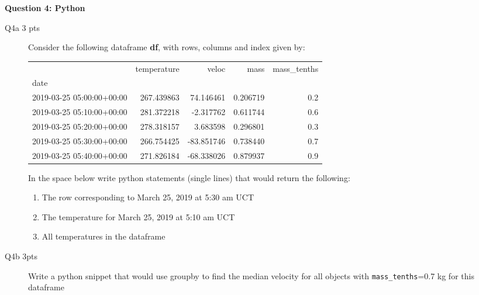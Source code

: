 \documentclass{article}
\begin{document}
\newpage
\textbf{Question 4: Python}
\begin{description}
\item[Q4a 3 pts] Consider the following dataframe \textbf{df}, with rows, columns and index given by:

\begin{tabular}{lrrrr}
\toprule
{} &  temperature &      veloc &      mass &  mass\_tenths \\
date                      &              &            &           &              \\
\midrule
2019-03-25 05:00:00+00:00 &   267.439863 &  74.146461 &  0.206719 &          0.2 \\
2019-03-25 05:10:00+00:00 &   281.372218 &  -2.317762 &  0.611744 &          0.6 \\
2019-03-25 05:20:00+00:00 &   278.318157 &   3.683598 &  0.296801 &          0.3 \\
2019-03-25 05:30:00+00:00 &   266.754425 & -83.851746 &  0.738440 &          0.7 \\
2019-03-25 05:40:00+00:00 &   271.826184 & -68.338026 &  0.879937 &          0.9 \\
\bottomrule
\end{tabular}

In the space below write python statements (single lines) that would
return the following:

\begin{enumerate}
\item The row corresponding to March 25, 2019 at 5:30 am UCT
\item The temperature for March 25, 2019 at 5:10 am UCT
\item All temperatures in the dataframe
\end{enumerate}

\vspace{5cm}

\item[Q4b 3pts] Write a python snippet that would use groupby to find
  the median velocity for all objects with \verb+mass_tenths+=0.7 kg for this
  dataframe
  
\end{description}
\end{document}
